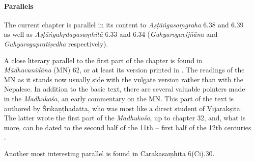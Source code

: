 
\paragraph*{Parallels}
The current chapter is parallel in its content to \textit{Aṣṭāṅgasaṃgraha} 6.38 and 6.39 as well as \textit{Aṣṭāṅgahṛdayasaṃhitā} 6.33 and 6.34 (\textit{Guhyarogavijñāna} and \textit{Guhyarogapratiṣedha} respectively).%

A close literary parallel to the first part of the chapter is found in \textit{Mādhavanidāna} (MN) 62, or at least its version printed in \citet{}. The readings of the MN as it stands now usually side with the vulgate version rather than with the Nepalese. In addition to the basic text, there are several valuable pointers made in the \textit{Madhukośa}, an early commentary on the MN. This part of the text is authored by Śrīkaṇṭhadatta, who was most like a direct student of Vijarakṣita. The latter wrote the first part of the \textit{Madhukośa}, up to chapter 32, and, what is more, can be dated to the second half of the 11th -- first half of the 12th centuries \citep[22--26]{meul-1974}.

Another most interesting parallel is found in Carakasaṃhitā 6(Ci).30.

